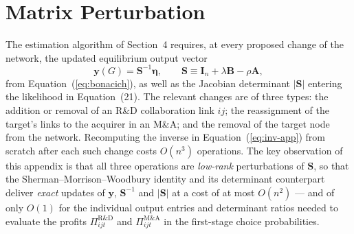 \section{Matrix Perturbation}
\label{sec:mat-perturb}

The estimation algorithm of Section~4 requires, at every proposed change
of the network, the updated equilibrium output vector
\begin{equation}
\mathbf{y}(G) = \mathbf{S}^{-1} \bm{\eta},
\qquad
\mathbf{S} \equiv \mathbf{I}_n + \lambda \mathbf{B} - \rho \mathbf{A},
\label{eq:inv-app}
\end{equation}
from Equation~(\ref{eq:bonacich}), as well as the Jacobian determinant
$|\mathbf{S}|$ entering the likelihood in Equation~(21). %
The relevant changes are of three types: the addition or removal of an
R\&D collaboration link $ij$; the reassignment of the target's links to
the acquirer in an M\&A; and the removal of the target node from the
network. Recomputing the inverse in Equation~(\ref{eq:inv-app}) from
scratch after each such change costs $O(n^3)$ operations. The key
observation of this appendix is that all three operations are
\emph{low-rank} perturbations of $\mathbf{S}$, so that the
Sherman--Morrison--Woodbury identity and its determinant counterpart
deliver \emph{exact} updates of $\mathbf{y}$, $\mathbf{S}^{-1}$ and
$|\mathbf{S}|$ at a cost of at most $O(n^2)$ --- and of only $O(1)$ for
the individual output entries and determinant ratios needed to evaluate
the profits $\Pi^{\mathrm{R\&D}}_{ijt}$ and $\Pi^{\mathrm{M\&A}}_{ijt}$
in the first-stage choice probabilities.

